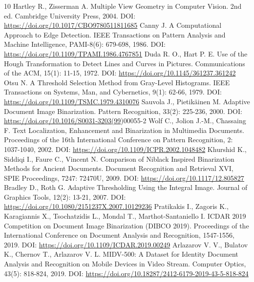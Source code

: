 \documentclass[letterpaper]{article}
\begin{document}
\begin{thebibliography}{10}
 Hartley R., Zisserman A. Multiple View Geometry in Computer Vision. 2nd ed. Cambridge University Press, 2004. DOI: \url{https://doi.org/10.1017/CBO9780511811685}
 Canny J. A Computational Approach to Edge Detection. IEEE Transactions on Pattern Analysis and Machine Intelligence, PAMI-8(6): 679-698, 1986. DOI: \url{https://doi.org/10.1109/TPAMI.1986.4767851}
 Duda R. O., Hart P. E. Use of the Hough Transformation to Detect Lines and Curves in Pictures. Communications of the ACM, 15(1): 11-15, 1972. DOI: \url{https://doi.org/10.1145/361237.361242}
 Otsu N. A Threshold Selection Method from Gray-Level Histograms. IEEE Transactions on Systems, Man, and Cybernetics, 9(1): 62-66, 1979. DOI: \url{https://doi.org/10.1109/TSMC.1979.4310076}
 Sauvola J., Pietikäinen M. Adaptive Document Image Binarization. Pattern Recognition, 33(2): 225-236, 2000. DOI: \url{https://doi.org/10.1016/S0031-3203(99})00055-2
 Wolf C., Jolion J.-M., Chassaing F. Text Localization, Enhancement and Binarization in Multimedia Documents. Proceedings of the 16th International Conference on Pattern Recognition, 2: 1037-1040, 2002. DOI: \url{https://doi.org/10.1109/ICPR.2002.1048482}
 Khurshid K., Siddiqi I., Faure C., Vincent N. Comparison of Niblack Inspired Binarization Methods for Ancient Documents. Document Recognition and Retrieval XVI, SPIE Proceedings, 7247: 72470U, 2009. DOI: \url{https://doi.org/10.1117/12.805827}
 Bradley D., Roth G. Adaptive Thresholding Using the Integral Image. Journal of Graphics Tools, 12(2): 13-21, 2007. DOI: \url{https://doi.org/10.1080/2151237X.2007.10129236}
 Pratikakis I., Zagoris K., Karagiannis X., Tsochatzidis L., Mondal T., Marthot-Santaniello I. ICDAR 2019 Competition on Document Image Binarization (DIBCO 2019). Proceedings of the International Conference on Document Analysis and Recognition, 1547-1556, 2019. DOI: \url{https://doi.org/10.1109/ICDAR.2019.00249}
 Arlazarov V. V., Bulatov K., Chernov T., Arlazarov V. L. MIDV-500: A Dataset for Identity Document Analysis and Recognition on Mobile Devices in Video Stream. Computer Optics, 43(5): 818-824, 2019. DOI: \url{https://doi.org/10.18287/2412-6179-2019-43-5-818-824}
\end{thebibliography}
\end{document}
